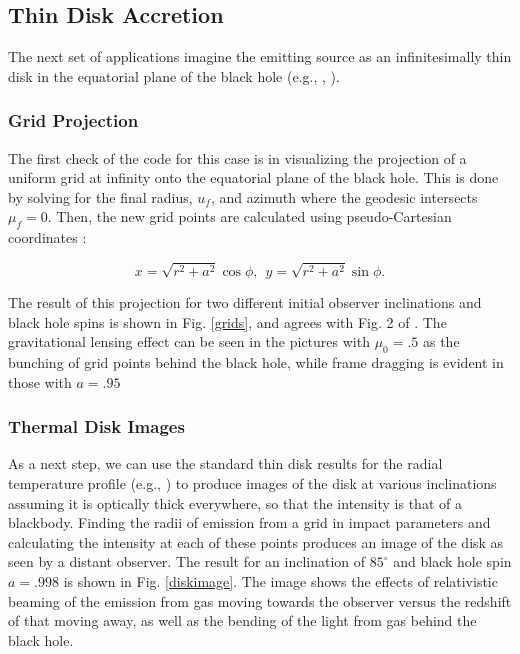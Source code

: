 \documentclass[apj]{emulateapj}
\begin{document}
\subsection{Thin Disk Accretion}

The next set of applications imagine the emitting source as an infinitesimally thin disk in the equatorial plane of the black hole (e.g., \citealt{page1974}, \citealt{shaksun1973}). 

\subsubsection{Grid Projection}

The first check of the code for this case is in visualizing the projection of a uniform grid at infinity onto the equatorial plane of the black hole. This is done by solving for the final radius, $u_f$, and azimuth where the geodesic intersects $\mu_f=0$. Then, the new grid points are calculated using pseudo-Cartesian coordinates \citep{schnittmanbertschinger2004}:

\begin{equation}
 x=\sqrt{r^2+a^2} \cos{\phi}, \hspace{5pt} y=\sqrt{r^2+a^2} \sin{\phi}.
\end{equation}

The result of this projection for two different initial observer inclinations and black hole spins is shown in Fig. \ref{grids}, and agrees with Fig. 2 of \citet{schnittmanbertschinger2004}. The gravitational lensing effect can be seen in the pictures with $\mu_0=.5$ as the bunching of grid points behind the black hole, while frame dragging is evident in those with $a=.95$

\subsubsection{Thermal Disk Images}

As a next step, we can use the standard thin disk results for the radial temperature profile (e.g., \citealt{krolikbook}) to produce images of the disk at various inclinations assuming it is optically thick everywhere, so that the intensity is that of a blackbody. Finding the radii of emission from a grid in impact parameters and calculating the intensity at each of these points produces an image of the disk as seen by a distant observer. The result for an inclination of $85^{\circ}$ and black hole spin $a=.998$ is shown in Fig. \ref{diskimage}. The image shows the effects of relativistic beaming of the emission from gas moving towards the observer versus the redshift of that moving away, as well as the bending of the light from gas behind the black hole.
\end{document}

